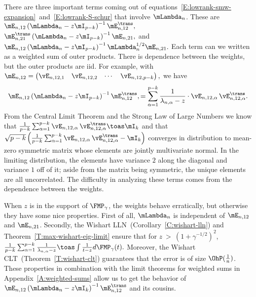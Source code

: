 There are three important terms coming out of equations~\eqref{E:lowrank-smw-expansion}~and~\eqref{E:lowrank-S-schur} that involve $\mLambda_n$.  These are
\(
    \mE_{n,12}
    \left(
        \mLambda_n - z \mI_{p-k}
    \right)^{-1}
    \mE_{n,12}^\trans,
\)
\(
    \mE_{n,21}^\trans
    \left(
        \mLambda_n - z \mI_{p-k}
    \right)^{-1}
    \mE_{n,21},
\)
and
\(
    \mE_{n,12}
    \left(
        \mLambda_n - z \mI_{p-k}
    \right)^{-1}
    \mLambda_n^{1/2}
    \mE_{n,21}.
\)
Each term can we written as a weighted sum of outer products.  There is
dependence between the weights, but the outer products are iid.  For example,
with
\(
    \mE_{n,12}
    =
    \left(
    \begin{matrix}
        \vE_{n,12,1} &
        \vE_{n,12,2} &
        \cdots &
        \vE_{n,12,p-k}
    \end{matrix}
    \right),
\) 
we have
\[
    \mE_{n,12}
    \left(
        \mLambda_n - z \mI_{p-k}
    \right)^{-1}
    \mE_{n,12}^\trans,
        =
            \sum_{\alpha=1}^{p-k}
                \frac{1}{\lambda_{n,\alpha} - z}
                \cdot
                \vE_{n,12,\alpha} \,
                \vE_{n,12,\alpha}^\trans.
\]
From the Central Limit Theorem and the Strong Law of Large Numbers
we know that
\(
    \frac{1}{p-k}
    \sum_{\alpha=1}^{p-k}
        \vE_{n,12,\alpha} \,
        \vE_{n,12,\alpha}^\trans
        \toas
            \mI_{k}
\)
and that
\(
    \sqrt{p-k}
    \left(
        \frac{1}{p-k}
        \sum_{\alpha=1}^{p-k}
            \vE_{n,12,\alpha} \,
            \vE_{n,12,\alpha}^\trans
        -
        \mI_{k}
    \right)
\)
converges in distribution to mean-zero symmetric matrix whose elements are jointly multivariate normal.  In the limiting distribution, the elements have variance $2$ along the diagonal and variance $1$ off of it; aside from the matrix being symmetric, the unique elements are all uncorrelated.  The
difficulty in analyzing these terms comes from the dependence between 
the weights.

When $z$ is in the support of $\FMP_\gamma$, the weights behave
erratically, but otherwise they have some nice properties.
First of all, $\mLambda_n$ is independent of $\mE_{n,12}$ and $\mE_{n,21}$.
Secondly, the Wishart LLN~(Corollary~\ref{C:wishart-lln}) and
Theorem~\ref{T:max-wishart-eig-limit} ensure that for
$z~>~(1+\gamma^{-1/2})^2$,
\(
    \frac{1}{p-k}
    \sum_{\alpha=1}^{p-k}
        \frac{1}{\lambda_{n,\alpha} - z}
    \toas
    \int
        \frac{1}{t - z}
        d\FMP_\gamma(t).
\)
Moreover, the Wishart CLT~(Theorem~\ref{T:wishart-clt}) guarantees that
the error is of size $\OhP(\frac{1}{n})$.  These properties in
combination with the limit theorems for weighted sums in 
Appendix~\ref{A:weighted-sums} allow us to get the behavior of
\(
    \mE_{n,12}
    \left(
        \mLambda_n
        -
        z
        \mI_k
    \right)^{-1}
    \mE_{n,12}^\trans
\)
and its cousins.

